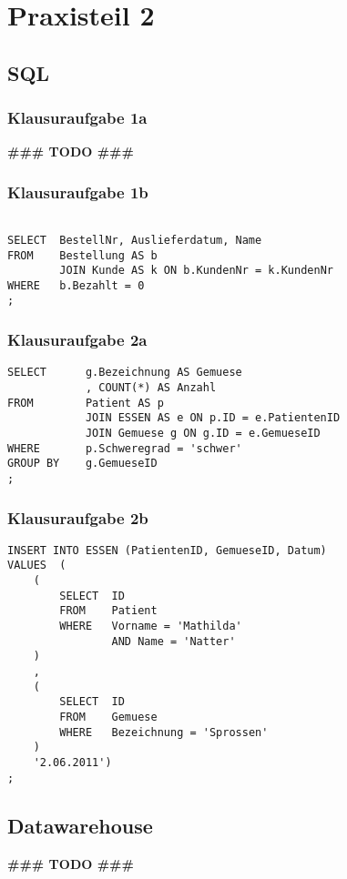 
\section{Praxisteil 2}

\subsection{SQL}

\subsubsection{Klausuraufgabe 1a}
\textbf{\#\#\# TODO \#\#\#}

\subsubsection{Klausuraufgabe 1b}

\lstset{style=customSQL}
\begin{lstlisting}

SELECT  BestellNr, Auslieferdatum, Name
FROM    Bestellung AS b
        JOIN Kunde AS k ON b.KundenNr = k.KundenNr
WHERE   b.Bezahlt = 0
;

\end{lstlisting}


\subsubsection{Klausuraufgabe 2a}

\lstset{style=customSQL}
\begin{lstlisting}
SELECT      g.Bezeichnung AS Gemuese
            , COUNT(*) AS Anzahl
FROM        Patient AS p
            JOIN ESSEN AS e ON p.ID = e.PatientenID
            JOIN Gemuese g ON g.ID = e.GemueseID
WHERE       p.Schweregrad = 'schwer'
GROUP BY    g.GemueseID
;

\end{lstlisting}

\subsubsection{Klausuraufgabe 2b}

\lstset{style=customSQL}
\begin{lstlisting}
INSERT INTO ESSEN (PatientenID, GemueseID, Datum)
VALUES  (
    (
        SELECT  ID
        FROM    Patient
        WHERE   Vorname = 'Mathilda'
                AND Name = 'Natter'
    )
    ,
    (
        SELECT  ID
        FROM    Gemuese
        WHERE   Bezeichnung = 'Sprossen'
    )
    '2.06.2011')
;
\end{lstlisting}


\subsection{Datawarehouse}
\textbf{\#\#\# TODO \#\#\#}





